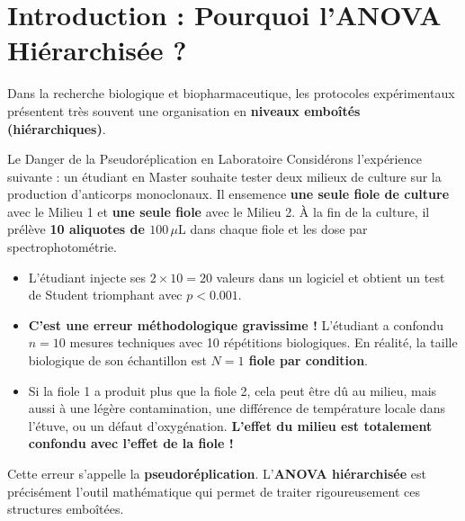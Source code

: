 \documentclass[11pt,a4paper]{article}
\begin{document}

\section{Introduction : Pourquoi l'ANOVA Hiérarchisée ?}

Dans la recherche biologique et biopharmaceutique, les protocoles expérimentaux présentent très souvent une organisation en \textbf{niveaux emboîtés (hiérarchiques)}. 

\begin{warnbox}{Le Danger de la Pseudoréplication en Laboratoire}
Considérons l'expérience suivante : un étudiant en Master souhaite tester deux milieux de culture sur la production d'anticorps monoclonaux. Il ensemence \textbf{une seule fiole de culture} avec le Milieu 1 et \textbf{une seule fiole} avec le Milieu 2. À la fin de la culture, il prélève \textbf{10 aliquotes de $100\,\mu\text{L}$} dans chaque fiole et les dose par spectrophotométrie.
\begin{itemize}[leftmargin=*, label=\faTimes]
  \item L'étudiant injecte ses $2 \times 10 = 20$ valeurs dans un logiciel et obtient un test de Student triomphant avec $p < 0.001$.
  \item \textbf{C'est une erreur méthodologique gravissime !} L'étudiant a confondu $n=10$ mesures techniques avec 10 répétitions biologiques. En réalité, la taille biologique de son échantillon est \textbf{$N = 1$ fiole par condition}.
  \item Si la fiole 1 a produit plus que la fiole 2, cela peut être dû au milieu, mais aussi à une légère contamination, une différence de température locale dans l'étuve, ou un défaut d'oxygénation. \textbf{L'effet du milieu est totalement confondu avec l'effet de la fiole !}
\end{itemize}
Cette erreur s'appelle la \textbf{pseudoréplication}. L'\textbf{ANOVA hiérarchisée} est précisément l'outil mathématique qui permet de traiter rigoureusement ces structures emboîtées.
\end{warnbox}
\end{document}
